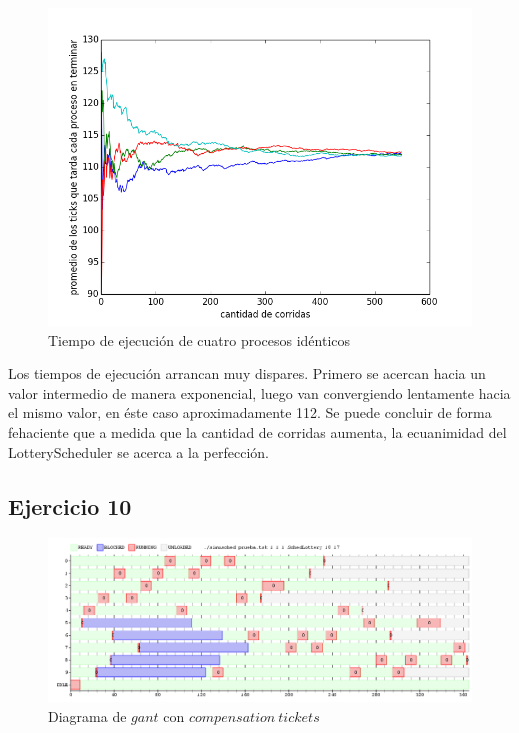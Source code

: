 \documentclass[a4paper]{article}
\begin{document}
\begin{figure}[H]
\centering
\includegraphics[scale=0.66]{../experimentacion/ej9-fairness/tiempo_final/prueba-tiempo-final.png}
\caption{Tiempo de ejecución de cuatro procesos idénticos}
\end{figure}

Los tiempos de ejecución arrancan muy dispares. Primero se acercan hacia un valor intermedio de manera exponencial, luego van convergiendo lentamente hacia el mismo valor, en éste caso aproximadamente 112. Se puede concluir de forma fehaciente que a medida que la cantidad de corridas aumenta, la ecuanimidad del LotteryScheduler se acerca a la perfección.

\newpage
\subsection{Ejercicio 10}

\begin{figure}[H]
\centering
\includegraphics[scale=0.5]{../experimentacion/ej10-compensation/gant-sin.png}
\caption{Diagrama de $gant$ con $compensation\ tickets$}
\end{figure}
\end{document}
